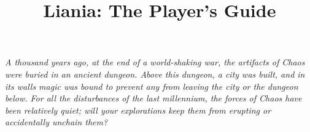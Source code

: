 \documentclass{article}
\title{Liania: The Player's Guide}
\begin{document}
\emph{A thousand years ago, at the end of a world-shaking war, the artifacts of Chaos were buried in an ancient dungeon. Above this dungeon, a city was built, and in its walls magic was bound to prevent any from leaving the city or the dungeon below. For all the disturbances of the last millennium, the forces of Chaos have been relatively quiet; will your explorations keep them from erupting or accidentally unchain them?}
\end{document}
